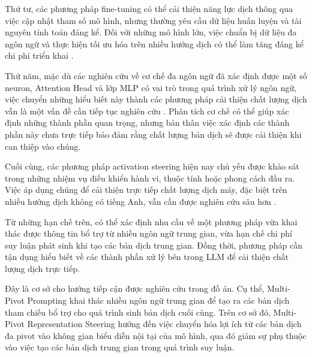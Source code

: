 Thứ tư, các phương pháp fine-tuning có thể cải thiện năng lực dịch thông qua việc cập nhật tham số mô hình, nhưng thường yêu cầu dữ liệu huấn luyện và tài nguyên tính toán đáng kể. Đối với những mô hình lớn, việc chuẩn bị dữ liệu đa ngôn ngữ và thực hiện tối ưu hóa trên nhiều hướng dịch có thể làm tăng đáng kể chi phí triển khai \cite{li-etal-2024-eliciting,yang-etal-2025-enanchored}.

Thứ năm, mặc dù các nghiên cứu về cơ chế đa ngôn ngữ đã xác định được một số neuron, Attention Head và lớp MLP có vai trò trong quá trình xử lý ngôn ngữ, việc chuyển những hiểu biết này thành các phương pháp cải thiện chất lượng dịch vẫn là một vấn đề cần tiếp tục nghiên cứu \cite{tang-etal-2024-language,zhang2026exploring,binbinliu2026token}. Phân tích cơ chế có thể giúp xác định những thành phần quan trọng, nhưng bản thân việc xác định các thành phần này chưa trực tiếp bảo đảm rằng chất lượng bản dịch sẽ được cải thiện khi can thiệp vào chúng.

Cuối cùng, các phương pháp activation steering hiện nay chủ yếu được khảo sát trong những nhiệm vụ điều khiển hành vi, thuộc tính hoặc phong cách đầu ra. Việc áp dụng chúng để cải thiện trực tiếp chất lượng dịch máy, đặc biệt trên nhiều hướng dịch không có tiếng Anh, vẫn cần được nghiên cứu sâu hơn \cite{rimsky-etal-2024-steering,li2023inference,scalena2026steering}.

Từ những hạn chế trên, có thể xác định nhu cầu về một phương pháp vừa khai thác được thông tin bổ trợ từ nhiều ngôn ngữ trung gian, vừa hạn chế chi phí suy luận phát sinh khi tạo các bản dịch trung gian. Đồng thời, phương pháp cần tận dụng hiểu biết về các thành phần xử lý bên trong LLM để cải thiện chất lượng dịch trực tiếp.

Đây là cơ sở cho hướng tiếp cận được nghiên cứu trong đồ án. Cụ thể, Multi-Pivot Prompting khai thác nhiều ngôn ngữ trung gian để tạo ra các bản dịch tham chiếu bổ trợ cho quá trình sinh bản dịch cuối cùng. Trên cơ sở đó, Multi-Pivot Representation Steering hướng đến việc chuyển hóa lợi ích từ các bản dịch đa pivot vào không gian biểu diễn nội tại của mô hình, qua đó giảm sự phụ thuộc vào việc tạo các bản dịch trung gian trong quá trình suy luận.
